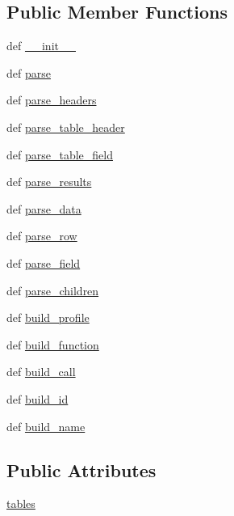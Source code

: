 \subsection*{Public Member Functions}
\begin{DoxyCompactItemize}
\item 
def \hyperlink{classgprof2dot_1_1AQtimeParser_aa59b49fada6b1c6fe520c4a54bca5e77}{\_\-\_\-init\_\-\_\-}
\item 
def \hyperlink{classgprof2dot_1_1AQtimeParser_ab1e9b6f7ddff3943366aba840235aa87}{parse}
\item 
def \hyperlink{classgprof2dot_1_1AQtimeParser_a0dee761c0b4c61e560bb1c3f072b741c}{parse\_\-headers}
\item 
def \hyperlink{classgprof2dot_1_1AQtimeParser_a04bf6c338f7dc92014aee30551531084}{parse\_\-table\_\-header}
\item 
def \hyperlink{classgprof2dot_1_1AQtimeParser_a48f22b51e594042737d0981c176ab6b8}{parse\_\-table\_\-field}
\item 
def \hyperlink{classgprof2dot_1_1AQtimeParser_a32b9f835b37afe23ec4625056d362aa3}{parse\_\-results}
\item 
def \hyperlink{classgprof2dot_1_1AQtimeParser_a8be190969437a5e4bb7fb9e23de6f65a}{parse\_\-data}
\item 
def \hyperlink{classgprof2dot_1_1AQtimeParser_ac0a6dae6925c42090428a57e4a12f58a}{parse\_\-row}
\item 
def \hyperlink{classgprof2dot_1_1AQtimeParser_a41f9d9db95c1bef28c89d9f4751b78ce}{parse\_\-field}
\item 
def \hyperlink{classgprof2dot_1_1AQtimeParser_a13b6a9afdad05501c9d8ca29d1b12181}{parse\_\-children}
\item 
def \hyperlink{classgprof2dot_1_1AQtimeParser_a73e031867ccede4d5134a237a0557d7b}{build\_\-profile}
\item 
def \hyperlink{classgprof2dot_1_1AQtimeParser_adb9096422670b456f863289f353a1442}{build\_\-function}
\item 
def \hyperlink{classgprof2dot_1_1AQtimeParser_a46b68311d7b2c1a49c920df87a43b15c}{build\_\-call}
\item 
def \hyperlink{classgprof2dot_1_1AQtimeParser_a0523f5cca159ef16101c9db5a05dcc7e}{build\_\-id}
\item 
def \hyperlink{classgprof2dot_1_1AQtimeParser_ad6570e9c5dbbd6902762c915058eb086}{build\_\-name}
\end{DoxyCompactItemize}
\subsection*{Public Attributes}
\begin{DoxyCompactItemize}
\item 
\hyperlink{classgprof2dot_1_1AQtimeParser_a9710b990cfcffca84b59c036e713868e}{tables}
\end{DoxyCompactItemize}


